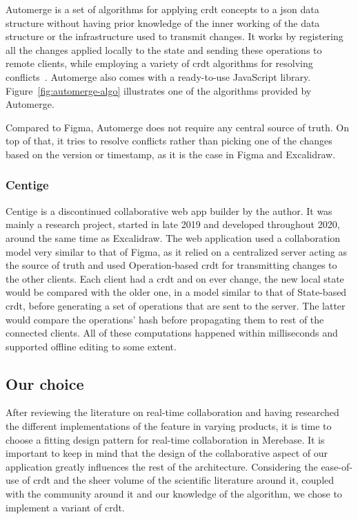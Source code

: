 \begin{toexclude}
  Automerge is a set of algorithms for applying \acrshort{crdt} concepts to a \acrfull{json} data structure without having prior knowledge of the inner working of the data structure or the infrastructure used to transmit changes.
  It works by registering all the changes applied locally to the state and sending these operations to remote clients, while employing a variety of \acrshort{crdt} algorithms for resolving conflicts~\autocite{kleppmann_conflict-free_2017}. Automerge also comes with a ready-to-use JavaScript library. Figure~\ref{fig:automerge-algo} illustrates one of the algorithms provided by Automerge.

  Compared to Figma, Automerge does not require any central source of truth. On top of that, it tries to resolve conflicts rather than picking one of the changes based on the version or timestamp, as it is the case in Figma and Excalidraw.

  \subsubsection{Centige}

  Centige is a discontinued collaborative web app builder by the author.
  It was mainly a research project, started in late 2019 and developed throughout 2020, around the same time as Excalidraw.
  The web application used a collaboration model very similar to that of Figma, as it relied on a centralized server acting as the source of truth and used Operation-based \acrshort{crdt} for transmitting changes to the other clients.
  Each client had a \acrfull{crdt} and on ever change, the new local state would be compared with the older one, in a model similar to that of State-based \acrshort{crdt}, before generating a set of operations that are sent to the server.
  The latter would compare the operations' hash before propagating them to rest of the connected clients.
  All of these computations happened within milliseconds and supported offline editing to some extent.

  \subsection{Our choice}

  After reviewing the literature on real-time collaboration and having researched the different implementations of the feature in varying products, it is time to choose a fitting design pattern for real-time collaboration in Merebase.
  It is important to keep in mind that the design of the collaborative aspect of our application greatly influences the rest of the architecture.
  Considering the ease-of-use of \acrfull{crdt} and the sheer volume of the scientific literature around it, coupled with the community around it and our knowledge of the algorithm, we chose to implement a variant of \acrshort{crdt}.


\end{toexclude}

